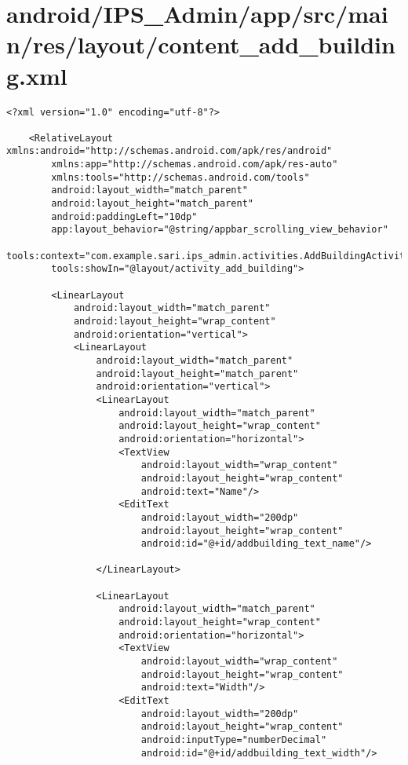 \section{android/IPS\_Admin/app/src/main/res/layout/content_add_building.xml}
\begin{lstlisting}<?xml version="1.0" encoding="utf-8"?>

    <RelativeLayout xmlns:android="http://schemas.android.com/apk/res/android"
        xmlns:app="http://schemas.android.com/apk/res-auto"
        xmlns:tools="http://schemas.android.com/tools"
        android:layout_width="match_parent"
        android:layout_height="match_parent"
        android:paddingLeft="10dp"
        app:layout_behavior="@string/appbar_scrolling_view_behavior"
        tools:context="com.example.sari.ips_admin.activities.AddBuildingActivity"
        tools:showIn="@layout/activity_add_building">

        <LinearLayout
            android:layout_width="match_parent"
            android:layout_height="wrap_content"
            android:orientation="vertical">
            <LinearLayout
                android:layout_width="match_parent"
                android:layout_height="match_parent"
                android:orientation="vertical">
                <LinearLayout
                    android:layout_width="match_parent"
                    android:layout_height="wrap_content"
                    android:orientation="horizontal">
                    <TextView
                        android:layout_width="wrap_content"
                        android:layout_height="wrap_content"
                        android:text="Name"/>
                    <EditText
                        android:layout_width="200dp"
                        android:layout_height="wrap_content"
                        android:id="@+id/addbuilding_text_name"/>

                </LinearLayout>

                <LinearLayout
                    android:layout_width="match_parent"
                    android:layout_height="wrap_content"
                    android:orientation="horizontal">
                    <TextView
                        android:layout_width="wrap_content"
                        android:layout_height="wrap_content"
                        android:text="Width"/>
                    <EditText
                        android:layout_width="200dp"
                        android:layout_height="wrap_content"
                        android:inputType="numberDecimal"
                        android:id="@+id/addbuilding_text_width"/>


\end{lstlisting}
